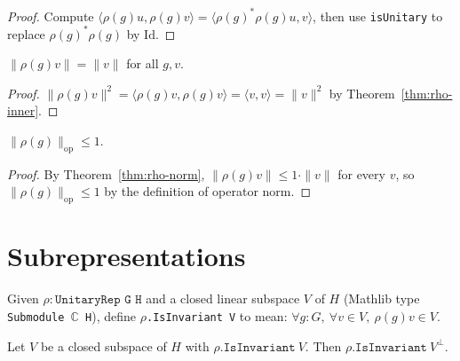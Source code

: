 \begin{proof}
  Compute $\langle \rho(g)u, \rho(g)v\rangle
   = \langle \rho(g)^*\rho(g) u, v\rangle$, then use \texttt{isUnitary}
  to replace $\rho(g)^*\rho(g)$ by $\mathrm{Id}$.
\end{proof}

\begin{theorem}
  \label{thm:rho-norm}
  \leanok
  $\|\rho(g) v\| = \|v\|$ for all $g, v$.
\end{theorem}

\begin{proof}
  $\|\rho(g)v\|^2 = \langle\rho(g)v, \rho(g)v\rangle =
   \langle v, v\rangle = \|v\|^2$ by Theorem~\ref{thm:rho-inner}.
\end{proof}

\begin{theorem}
  \label{thm:rho-opNorm}
  \leanok
  $\|\rho(g)\|_{\mathrm{op}} \leq 1$.
\end{theorem}

\begin{proof}
  By Theorem~\ref{thm:rho-norm}, $\|\rho(g)v\| \leq 1 \cdot \|v\|$
  for every $v$, so $\|\rho(g)\|_\mathrm{op} \leq 1$ by
  the definition of operator norm.
\end{proof}

\section{Subrepresentations}

\begin{definition}
  \label{def:isInvariant}
  \leanok
  Given $\rho : \texttt{UnitaryRep G H}$ and a closed linear subspace
  $V$ of $H$ (Mathlib type \texttt{Submodule $\mathbb C$ H}), define
  \texttt{$\rho$.IsInvariant V} to mean:
  $\forall g : G,\ \forall v \in V,\ \rho(g) v \in V$.
\end{definition}

\begin{theorem}
  \label{thm:orthCompl-invariant}
  \leanok
  Let $V$ be a closed subspace of $H$ with $\rho.\texttt{IsInvariant}\ V$.
  Then $\rho.\texttt{IsInvariant}\ V^\perp$.
\end{theorem}

